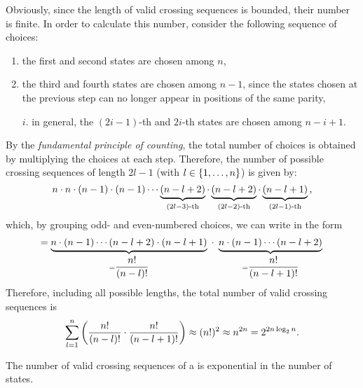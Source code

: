 Obviously, since the length of valid crossing sequences is bounded, their number is finite.
In order to calculate this number, consider the following sequence of choices:
\begin{enumerate}
	\item \label{itm:num-crosseq-1} the first and second states are chosen among $n$,
	\item the third and fourth states are chosen among $n-1$, since the states chosen at the previous step can no longer appear in positions of the same parity,
	\item[$i$.] in general, the $(2i-1)$-th and $2i$-th states are chosen among $n-i+1$.
\end{enumerate}
By the \emph{fundamental principle of counting}, the total number of choices is obtained by multiplying the choices at each step.
Therefore, the number of possible crossing sequences of length $2l-1$ (with $l\in\{1,\dots,n\}$) is given by:
\begin{equation*}
	n \cdot n \cdot (n-1) \cdot (n-1) \cdots \underbrace{(n-l+2)}_{(2l-3)\text{-th}} \cdot \underbrace{(n-l+2)}_{(2l-2)\text{-th}} \cdot \underbrace{(n-l+1)}_{(2l-1)\text{-th}} \text,
\end{equation*}
which, by grouping odd- and even-numbered choices, we can write in the form
\begin{equation*}
	= \underbrace{n \cdot (n-1) \cdots (n-l+2) \cdot (n-l+1)}_{=\dfrac{n!}{(n-l)!}} \; \cdot \; \underbrace{n \cdot (n-1) \cdots (n-l+2)}_{=\dfrac{n!}{(n-l+1)!}} \\
\end{equation*}
Therefore, including all possible lengths, the total number of valid crossing sequences is
\begin{align*}
	\sum_{l=1}^n \left(\frac{n!}{(n-l)!}\cdot\frac{n!}{(n-l+1)!}\right) \approx (n!)^2 \approx n^{2n} = 2^{2n \log_2 n} \text.
\end{align*}

\begin{fact}\label{fact:crossing-2DFA-num}
	The number of valid crossing sequences of a \TDFA is exponential in the number of states.
\end{fact}


